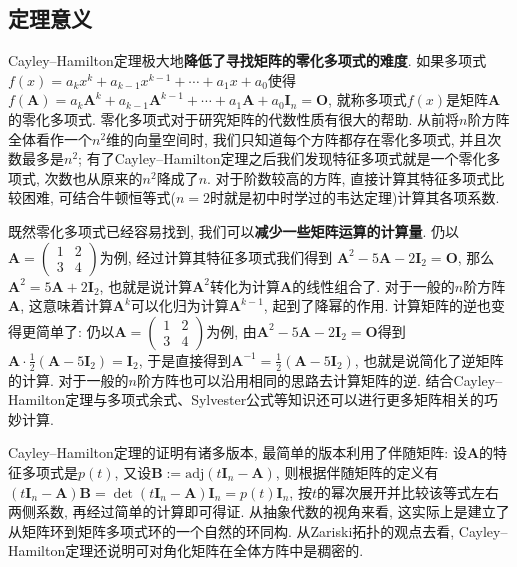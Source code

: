 \documentclass[main]{subfiles}
\newcommand{\dis}{\displaystyle}
\newcommand{\adj}{\mathrm{adj}}
\begin{document}
\subsection{定理意义}
Cayley–Hamilton定理极大地\textbf{降低了寻找矩阵的零化多项式的难度}. 如果多项式$f(x)=a_{k}x^{k}+a_{k-1}x^{k-1}+\cdots+a_{1}x+a_0$使得$f(\boldsymbol{A})=a_{k}\boldsymbol{A}^{k}+a_{k-1}\boldsymbol{A}^{k-1}+\cdots+a_{1}\boldsymbol{A}+a_0\boldsymbol{I}_n=\boldsymbol{O}$, 就称多项式$f(x)$是矩阵$\boldsymbol{A}$的零化多项式. 零化多项式对于研究矩阵的代数性质有很大的帮助. 从前将$n$阶方阵全体看作一个$n^{2}$维的向量空间时, 我们只知道每个方阵都存在零化多项式, 并且次数最多是$n^2$; 有了Cayley–Hamilton定理之后我们发现特征多项式就是一个零化多项式, 次数也从原来的$n^2$降成了$n$. 对于阶数较高的方阵, 直接计算其特征多项式比较困难, 可结合牛顿恒等式($n=2$时就是初中时学过的韦达定理)计算其各项系数.

既然零化多项式已经容易找到, 我们可以\textbf{减少一些矩阵运算的计算量}. 仍以$\boldsymbol{A}=\begin{pmatrix}
		1 & 2 \\
		3 & 4
	\end{pmatrix}$为例,
经过计算其特征多项式我们得到
$\boldsymbol{A}^2-5\boldsymbol{A}-2\boldsymbol{I}_2=\boldsymbol{O}$,
那么$\boldsymbol{A}^2=5\boldsymbol{A}+2\boldsymbol{I}_2$,
也就是说计算$\boldsymbol{A}^2$转化为计算$\boldsymbol{A}$的线性组合了.
对于一般的$n$阶方阵$\boldsymbol{A}$,
这意味着计算$\boldsymbol{A}^{k}$可以化归为计算$\boldsymbol{A}^{k-1}$,
起到了降幂的作用. 计算矩阵的逆也变得更简单了: 仍以$\boldsymbol{A}=\begin{pmatrix}
		1 & 2 \\
		3 & 4
	\end{pmatrix}$为例, 由$\boldsymbol{A}^2-5\boldsymbol{A}-2\boldsymbol{I}_2=\boldsymbol{O}$得到$\dis\boldsymbol{A}\cdot\frac{1}{2}(\boldsymbol{A}-5\boldsymbol{I}_2)=\boldsymbol{I}_2$, 于是直接得到$\dis\boldsymbol{A}^{-1}=\frac{1}{2}(\boldsymbol{A}-5\boldsymbol{I}_2)$, 也就是说简化了逆矩阵的计算. 对于一般的$n$阶方阵也可以沿用相同的思路去计算矩阵的逆. 结合Cayley–Hamilton定理与多项式余式、Sylvester公式等知识还可以进行更多矩阵相关的巧妙计算.

Cayley–Hamilton定理的证明有诸多版本, 最简单的版本利用了伴随矩阵: 设$\boldsymbol{A}$的特征多项式是$p(t)$, 又设$\boldsymbol{B}:=\adj(t\boldsymbol{I}_n-\boldsymbol{A})$, 则根据伴随矩阵的定义有$(t\boldsymbol{I}_n-\boldsymbol{A})\boldsymbol{B}=\det(t\boldsymbol{I}_n-\boldsymbol{A})\boldsymbol{I}_n=p(t)\boldsymbol{I}_n$, 按$t$的幂次展开并比较该等式左右两侧系数, 再经过简单的计算即可得证. 从抽象代数的视角来看, 这实际上是建立了从矩阵环到矩阵多项式环的一个自然的环同构. 从Zariski拓扑的观点去看, Cayley–Hamilton定理还说明可对角化矩阵在全体方阵中是稠密的.
\end{document}
